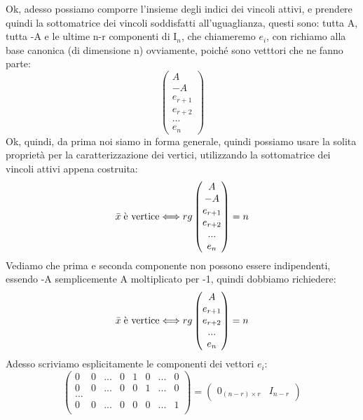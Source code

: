 \noindent Ok, adesso possiamo comporre l'insieme degli indici dei vincoli attivi, e prendere quindi la sottomatrice dei vincoli soddisfatti all'uguaglianza, questi sono: tutta A, tutta -A e le ultime n-r componenti di I$_n$, che chiameremo $e_i$, con richiamo alla base canonica (di dimensione n) ovviamente, poiché sono vetttori che ne fanno parte:
\begin{equation*}
    \begin{pmatrix}
        A\\
        -A\\
        e_{r+1}\\
        e_{r+2}\\
        ...\\
        e_{n}
    \end{pmatrix}
\end{equation*}
Ok, quindi, da prima noi siamo in forma generale, quindi possiamo usare la solita proprietà per la caratterizzazione dei vertici, utilizzando la sottomatrice dei vincoli attivi appena costruita:
\begin{equation*}
    \bar{x} \hspace{0.1cm} \text{è vertice} \Longleftrightarrow rg\begin{pmatrix}
        A\\
        -A\\
        e_{r+1}\\
        e_{r+2}\\
        ...\\
        e_{n}
    \end{pmatrix} = n 
\end{equation*}
Vediamo che prima e seconda componente non possono essere indipendenti, essendo -A semplicemente A moltiplicato per -1, quindi dobbiamo richiedere:
\begin{equation*}
    \bar{x} \hspace{0.1cm} \text{è vertice} \Longleftrightarrow rg\begin{pmatrix}
        A\\
        e_{r+1}\\
        e_{r+2}\\
        ...\\
        e_{n}
    \end{pmatrix} = n
\end{equation*}
Adesso scriviamo esplicitamente le componenti dei vettori $e_i$:
\begin{equation*}
    \begin{pmatrix}
        0 & 0 & ... & 0 & 1 & 0 & ... & 0\\
        0 & 0 & ... & 0 & 0 & 1 & ... & 0\\
        ...\\
        0 & 0 & ... & 0 & 0 & 0 & ... & 1\\
    \end{pmatrix} = \begin{pmatrix}
        0_{(n-r) \times r} & I_{n - r}
    \end{pmatrix}
\end{equation*}
